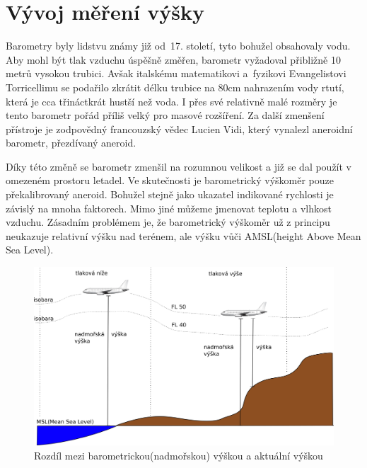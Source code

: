 		
	\section{Vývoj měření výšky}
	
		Barometry byly lidstvu známy již od~17. století, tyto bohužel obsahovaly vodu. Aby mohl být tlak vzduchu úspěšně změřen, barometr vyžadoval přibližně 10 metrů vysokou trubici. Avšak italskému matematikovi a~fyzikovi Evangelistovi Torricellimu se podařilo zkrátit délku trubice na 80cm nahrazením vody rtutí, která je cca třináctkrát hustší než voda. I přes své relativně malé rozměry je tento barometr pořád příliš velký pro masové rozšíření. Za další zmenšení přístroje je zodpovědný francouzský vědec Lucien Vidi, který vynalezl aneroidní barometr, přezdívaný aneroid\cite{history::aneroid}.\par
		Díky této změně se barometr zmenšil na rozumnou velikost a již se dal použít v omezeném prostoru letadel. Ve skutečnosti je barometrický výškoměr pouze překalibrovaný aneroid. Bohužel stejně jako ukazatel indikované rychlosti je závislý na mnoha faktorech. Mimo jiné můžeme jmenovat teplotu a vlhkost vzduchu. Zásadním problémem je, že barometrický výškoměr už z principu neukazuje relativní výšku nad terénem, ale výšku vůči AMSL(height Above Mean Sea Level).
	
		\begin{figure}[H]
			\begin{center}
				\includegraphics[scale=0.75]{obrazky-figures/flight_level.png}
				\caption{Rozdíl mezi barometrickou(nadmořskou) výškou a aktuální výškou}\label{historie::vyvojMereniVysky::FL}
			\end{center}
		\end{figure}

	
	
